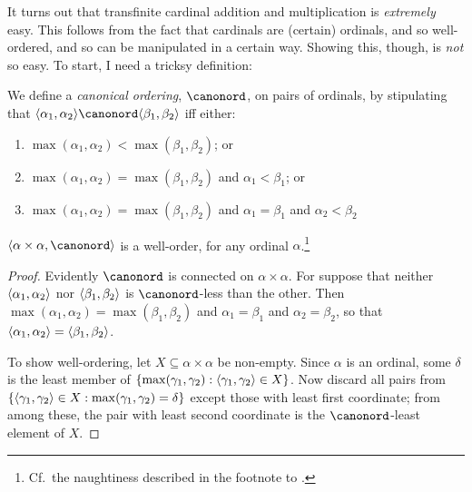 \documentclass[../../../include/open-logic-section]{subfiles}
\begin{document}


It turns out that transfinite cardinal addition and multiplication is
\emph{extremely} easy. This follows from the fact that cardinals are
(certain) ordinals, and so well-ordered, and so can be manipulated in
a certain way. Showing this, though, is \emph{not} so easy. To start,
I need a tricksy definition:

\begin{defn}
We define a \emph{canonical ordering}, $\canonord$, on pairs of
ordinals, by stipulating that $\tuple{\alpha_1, \alpha_2} \canonord
\tuple{\beta_1, \beta_2}$ iff either:
\begin{enumerate}
	\item $\max(\alpha_1, \alpha_2) < \max(\beta_1, \beta_2)$; or
	\item $\max(\alpha_1, \alpha_2) = \max(\beta_1, \beta_2)$ and
	$\alpha_1 < \beta_1$; or
	\item $\max(\alpha_1, \alpha_2) = \max(\beta_1, \beta_2)$ and
	$\alpha_1 = \beta_1$ and $\alpha_2 < \beta_2$
\end{enumerate}
\end{defn}

\begin{lem}
$\tuple{\alpha \times \alpha, \canonord}$ is a well-order, for any
ordinal $\alpha$.\footnote{Cf.\ the naughtiness described in the
footnote to .}
\end{lem}

\begin{proof}
Evidently $\canonord$ is connected on $\alpha \times \alpha$. For
suppose that neither $\langle \alpha_1, \alpha_2 \rangle$ nor $\langle \beta_1,
\beta_2 \rangle$ is $\canonord$-less than the other. Then $\max(\alpha_1,
\alpha_2) = \max(\beta_1, \beta_2)$ and $\alpha_1 = \beta_1$ and
$\alpha_2 = \beta_2$, so that $\langle \alpha_1, \alpha_2 \rangle =
\langle \beta_1,  \beta_2 \rangle$.

To show well-ordering, let $X \subseteq \alpha\times\alpha$ be
non-empty. Since $\alpha$ is an ordinal, some $\delta$ is the least
member of $\{ \max(\gamma_1, \gamma_2) : \langle \gamma_1,
\gamma_2 \rangle \in X \}$. Now discard all pairs from
$\{ \langle \gamma_1,\gamma_2 \rangle \in X : \max(\gamma_1, \gamma_2) =
\delta \}$ except those with least first coordinate; from among these,
the pair with least second coordinate is the $\canonord$-least element
of $X$.
\end{proof}
\end{document}

